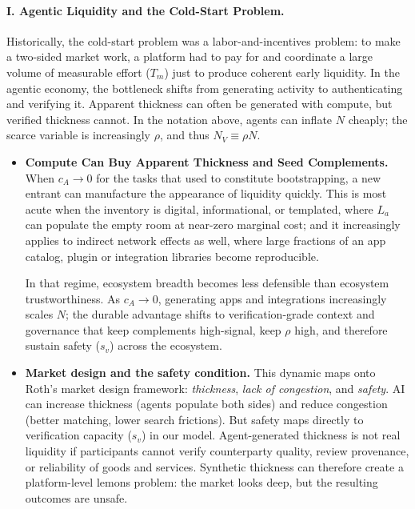 \documentclass[12pt, letter]{article}
\begin{document}
\paragraph{I. Agentic Liquidity and the Cold-Start Problem.} Historically, the cold-start problem was a labor-and-incentives problem: to make a two-sided market work, a platform had to pay for and coordinate a large volume of measurable effort ($T_m$) just to produce coherent early liquidity. In the agentic economy, the bottleneck shifts from generating activity to authenticating and verifying it. Apparent thickness can often be generated with compute, but verified thickness cannot. In the notation above, agents can inflate $N$ cheaply; the scarce variable is increasingly $\rho$, and thus $N_V \equiv \rho N$.
\begin{itemize}
\item \textbf{Compute Can Buy Apparent Thickness and Seed Complements.}  When $c_A \to 0$ for the tasks that used to constitute bootstrapping, a new entrant can manufacture the appearance of liquidity quickly. This is most acute when the inventory is digital, informational, or templated, where $L_a$ can populate the empty room at near-zero marginal cost; and it increasingly applies to indirect network effects as well, where large fractions of an app catalog, plugin or integration libraries become reproducible.

In that regime, ecosystem breadth becomes less defensible than ecosystem trustworthiness. As $c_A \to 0$, generating apps and integrations increasingly scales $N$; the durable advantage shifts to verification-grade context and governance that keep complements high-signal, keep $\rho$ high, and therefore sustain safety ($s_v$) across the ecosystem.

\item \textbf{Market design and the safety condition.} This dynamic maps onto Roth's market design framework: \textit{thickness}, \textit{lack of congestion}, and \textit{safety}. AI can increase thickness (agents populate both sides) and reduce congestion (better matching, lower search frictions). But safety maps directly to verification capacity ($s_v$) in our model. Agent-generated thickness is not real liquidity if participants cannot verify counterparty quality, review provenance, or reliability of goods and services. Synthetic thickness can therefore create a platform-level lemons problem: the market looks deep, but the resulting outcomes are unsafe.
\end{itemize}
\end{document}
